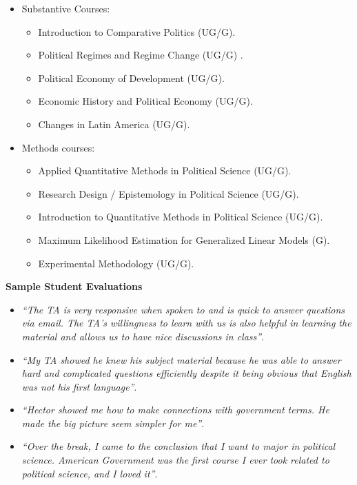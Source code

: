 \documentclass[11pt]{letter} %
\begin{document}
\begin{letter}{}
\begin{itemize}
\item Substantive Courses:
	\begin{itemize}
	\item Introduction to Comparative Politics (UG/G).
	\item Political Regimes and Regime Change (UG/G) .
	\item Political Economy of Development (UG/G).
	\item Economic History and Political Economy (UG/G).
	\item Changes in Latin America (UG/G).
	\end{itemize}
\item Methods courses:
	\begin{itemize}
	\item Applied Quantitative Methods in Political Science (UG/G).
	\item Research Design / Epistemology in Political Science (UG/G).
	\item Introduction to Quantitative Methods in Political Science (UG/G).
	\item Maximum Likelihood Estimation for Generalized Linear Models (G).
	\item Experimental Methodology (UG/G).
	\end{itemize}
\end{itemize}


{\bf Sample Student Evaluations}
{\scriptsize
\begin{itemize}

\item \emph{``The TA is very responsive when spoken to and is quick to answer questions via email. The TA's willingness to learn with us is also helpful in learning the material and allows us to have nice discussions in class''}.

\item \emph{``My TA showed he knew his subject material because he was able to answer hard and complicated questions efficiently despite it being obvious that English was not his first language''}.

\item \emph{``Hector showed me how to make connections with government terms. He made the big picture seem simpler for me''}.

\item \emph{``Over the break, I came to the conclusion that I want to major in political science. American Government was the first course I ever took related to political science, and I loved it''}.


\end{itemize}}
\end{letter}
\end{document}
